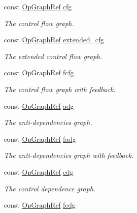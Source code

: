 \begin{DoxyCompactItemize}
const \hyperlink{op__graph_8hpp_aee97c95c40f791b60c451d9e29c72d39}{Op\+Graph\+Ref} \hyperlink{classFunctionBehavior_a7bf00873cbc76039ca84448e993dc970}{cfg}
\begin{DoxyCompactList}\small\item\em The control flow graph. \end{DoxyCompactList}\item 
const \hyperlink{op__graph_8hpp_aee97c95c40f791b60c451d9e29c72d39}{Op\+Graph\+Ref} \hyperlink{classFunctionBehavior_a074a4d24af012f74808c5769d3c5b3c7}{extended\+\_\+cfg}
\begin{DoxyCompactList}\small\item\em The extended control flow graph. \end{DoxyCompactList}\item 
const \hyperlink{op__graph_8hpp_aee97c95c40f791b60c451d9e29c72d39}{Op\+Graph\+Ref} \hyperlink{classFunctionBehavior_afdc849d82c1535e37b89aecbd684cc53}{fcfg}
\begin{DoxyCompactList}\small\item\em The control flow graph with feedback. \end{DoxyCompactList}\item 
const \hyperlink{op__graph_8hpp_aee97c95c40f791b60c451d9e29c72d39}{Op\+Graph\+Ref} \hyperlink{classFunctionBehavior_ab2ee4befae49706cb898593462e782f9}{adg}
\begin{DoxyCompactList}\small\item\em The anti-\/dependencies graph. \end{DoxyCompactList}\item 
const \hyperlink{op__graph_8hpp_aee97c95c40f791b60c451d9e29c72d39}{Op\+Graph\+Ref} \hyperlink{classFunctionBehavior_ae8d7948c9e13d74d24cb0f0d5ea33985}{fadg}
\begin{DoxyCompactList}\small\item\em The anti-\/dependencies graph with feedback. \end{DoxyCompactList}\item 
const \hyperlink{op__graph_8hpp_aee97c95c40f791b60c451d9e29c72d39}{Op\+Graph\+Ref} \hyperlink{classFunctionBehavior_adf8e6f930dc469fd3de3c56b731d4a0e}{cdg}
\begin{DoxyCompactList}\small\item\em The control dependence graph. \end{DoxyCompactList}\item 
const \hyperlink{op__graph_8hpp_aee97c95c40f791b60c451d9e29c72d39}{Op\+Graph\+Ref} \hyperlink{classFunctionBehavior_ace42dfa2365d6c4475382848a7285646}{fcdg}

\end{DoxyCompactItemize}
